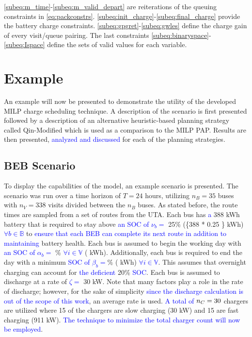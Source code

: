 \documentclass[utf8]{FrontiersinHarvard}
\newcommand{\A}{35 }                                                            %
\newcommand{\N}{338 }                                                           %
\newcommand{\acharge}{0.9}                                                      %
\newcommand{\bcharge}{0.7 }                                                     %
\newcommand{\mincharge}{25\% }                                                  %
\newcommand{\minchargeD}{0.25 }                                                 %
\newcommand{\batsize}{388 }                                                     %
\newcommand{\fast}{15 }                                                         %
\newcommand{\slow}{15 }                                                         %
\newcommand{\fasts}{911 }                                                       %
\newcommand{\slows}{30 }                                                        %
\begin{document}
\autoref{subeq:m_time}-\autoref{subeq:m_valid_depart} are reiterations of the queuing constraints in
\autoref{eq:packconstrs}. \autoref{subeq:init_charge}-\autoref{subeq:final_charge} provide the battery charge
constraints. \autoref{subeq:gpgret}-\autoref{subeq:gwles} define the charge gain of every visit/queue pairing. The last
constraints \autoref{subeq:binaryspace}-\autoref{subeq:Ispace} define the sets of valid values for each variable.
\section{Example}
\label{sec:example}
An example will now be presented to demonstrate the utility of the developed MILP charge scheduling technique. A
description of the scenario is first presented followed by a description of an alternative heuristic-based planning
strategy called Qin-Modified which is used as a comparison to the MILP PAP. Results are then presented,
\textcolor{blue}{analyzed and discussed} for each of the planning strategies.

\subsection{BEB Scenario}
\label{beb-scenario}
To display the capabilities of the model, an example scenario is presented. The scenario was run over a time horizon of
\(T=24\) hours, utilizing \(n_B = \A\) buses with \(n_V = \N\) visits divided between the \(n_B\) buses. As stated before, the
route times are sampled from a set of routes from the UTA. Each bus has \textcolor{blue}{a} \batsize kWh
battery that is required to stay above \textcolor{blue}{an SOC of $\nu_b =$} \mincharge (\fpeval\{\batsize *
\minchargeD\} kWh) \textcolor{blue}{$\forall b \in \mathbb{B}$} to \textcolor{blue}{ensure that each BEB can complete its next route in addition to maintaining} battery health. Each bus is assumed to begin the working day with
\textcolor{blue}{an SOC of $\alpha_b = $} \fpeval{\acharge*100}\% \textcolor{blue}{$\forall i \in \mathbb{V}$}
(\fpeval{\acharge * \batsize} kWh). Additionally, each bus is required to end the day with a minimum
\textcolor{blue}{ SOC of $\beta_b = $}\fpeval{\bcharge * 100}\% (\fpeval{\bcharge * \batsize} kWh)
\textcolor{blue}{$\forall i \in \mathbb{V}$}. This assumes that overnight charging can account for
\textcolor{blue}{the deficient} 20\% \textcolor{blue}{SOC}. Each bus is assumed to discharge at a
rate of \textcolor{blue}{$\zeta = $} 30 kW. Note that many factors play a role in the rate of discharge; however,
for the sake of simplicity \textcolor{blue}{since the discharge calculation is out of the scope of this work}, an average rate is used. \textcolor{blue}{A total of} \(n_C = \fpeval{\fast + \slow}\) chargers are
utilized where \slow of the chargers are slow charging (\slows kW) and \fast are fast charging (\fasts kW).
\textcolor{blue}{The technique to minimize the total charger count will now be employed}.
\end{document}
